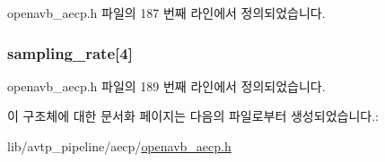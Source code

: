 openavb\+\_\+aecp.\+h 파일의 187 번째 라인에서 정의되었습니다.

\subsubsection[{\texorpdfstring{sampling\+\_\+rate}{sampling_rate}}]{ sampling\+\_\+rate\mbox{[}4\mbox{]}}\hypertarget{structopenavb__aecp__response__data__get__sampling__rate__t_a6b09041f69d1e15bd5278514758e680a}{}\label{structopenavb__aecp__response__data__get__sampling__rate__t_a6b09041f69d1e15bd5278514758e680a}


openavb\+\_\+aecp.\+h 파일의 189 번째 라인에서 정의되었습니다.



이 구조체에 대한 문서화 페이지는 다음의 파일로부터 생성되었습니다.\+:\begin{DoxyCompactItemize}
\item 
lib/avtp\+\_\+pipeline/aecp/\hyperlink{openavb__aecp_8h}{openavb\+\_\+aecp.\+h}\end{DoxyCompactItemize}
